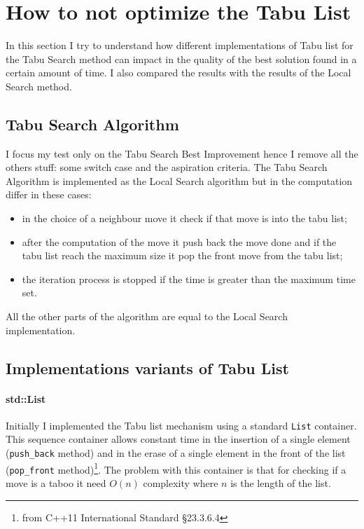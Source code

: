 \documentclass[]{article}
\title{}
\author{Eduard Bicego}
\begin{document}
\maketitle

\section{How to not optimize the Tabu List}
	In this section I try to understand how different implementations of Tabu list for the Tabu Search method can impact in the quality of the best solution found in a certain amount of time. I also compared the results with the results of the Local Search method.

\subsection{Tabu Search Algorithm}
	I focus my test only on the Tabu Search Best Improvement hence I remove all the others stuff: some switch case and the aspiration criteria.
	The Tabu Search Algorithm is implemented as the Local Search algorithm but in the computation differ in these cases:
	\begin{itemize}
		\item in the choice of a neighbour move it check if that move is into the tabu list;
		\item after the computation of the move it push back the move done and if the tabu list reach the maximum size it pop the front move from the tabu list;
		\item the iteration process is stopped if the time is greater than the maximum time set.
	\end{itemize}
	All the other parts of the algorithm are equal to the Local Search implementation.
	
	
	

	\subsection{Implementations variants of Tabu List}
		
		\paragraph{std::List} Initially I implemented the Tabu list mechanism using a standard \verb|List| container. This sequence container allows constant time in the insertion of a single element (\verb|push_back| method) and in the erase of a single element in the front of the list (\verb|pop_front| method)\footnote{from C++11 International Standard §23.3.6.4}.
		The problem with this container is that for checking if a move is a taboo it need $O(n)$ complexity where $n$ is the length of the list.
		
\end{document}
